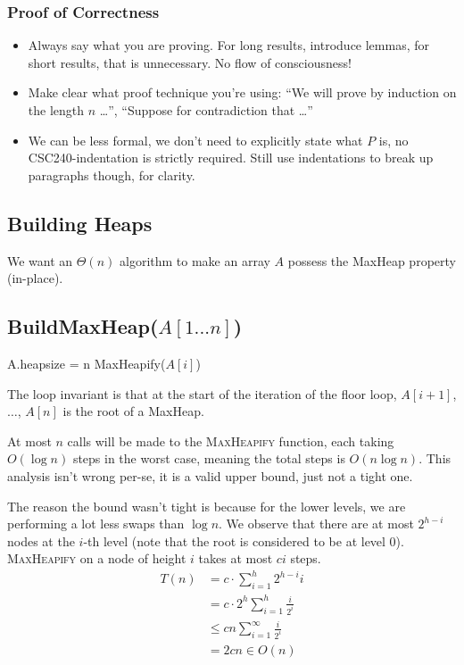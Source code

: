 \subsubsection*{Proof of Correctness}
\begin{itemize}
    \item Always say what you are proving. For long results, introduce lemmas, for short results, that is unnecessary. No flow of consciousness!
    \item Make clear what proof technique you're using: ``We will prove by induction on the length $n$ \dots '', ``Suppose for contradiction that \dots''
    \item We can be less formal, we don't need to explicitly state what $P$ is, no CSC240-indentation is strictly required. Still use indentations to break up paragraphs though, for clarity.
\end{itemize}

\newpage
\subsection{Building Heaps}

We want an $\Theta(n)$ algorithm to make an array $A$ possess the MaxHeap property (in-place). 

\subsection*{BuildMaxHeap($A[1...n]$)}
\begin{algorithmic}[1]
\State A.heapsize = n
    \State MaxHeapify($A[i]$)
\EndFor
\end{algorithmic}
The loop invariant is that at the start of the iteration of the floor loop, $A[i+1]$, $\dots$, $A[n]$ is the root of a MaxHeap. 

At most $n$ calls will be made to the \textsc{MaxHeapify} function, each taking $O(\log n)$ steps in the worst case, meaning the total steps is $O(n \log n)$. This analysis isn't wrong per-se, it is a valid upper bound, just not a tight one.

The reason the bound wasn't tight is because for the lower levels, we are performing a lot less swaps than $\log n$. We observe that there are at most $2^{h - i}$ nodes at the $i$-th level (note that the root is considered to be at level 0). \textsc{MaxHeapify} on a node of height $i$ takes at most $ci$ steps.
\begin{align*}
    T(n) &= c \cdot \sum_{i=1}^{h} 2^{h-i} i \\
    &= c \cdot 2^h \sum_{i=1}^{h} \frac{i}{2^i} \\
    &\leq cn \sum_{i=1}^{\infty} \frac{i}{2^i} \\
    &= 2cn \in O(n)
\end{align*}

